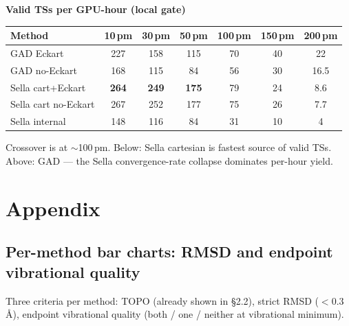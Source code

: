 \documentclass[11pt]{article}
\begin{document}
\begin{center}
\textbf{Valid TSs per GPU-hour (local gate)} \\[0.3em]
\begin{tabular}{l|cccccc}
\toprule
Method & 10\,pm & 30\,pm & 50\,pm & 100\,pm & 150\,pm & 200\,pm \\
\midrule
GAD Eckart                  & 227 & 158 & 115 & 70 & 40 & 22 \\
GAD no-Eckart               & 168 & 115 & 84 & 56 & 30 & 16.5 \\
Sella cart+Eckart           & \textbf{264} & \textbf{249} & \textbf{175} & 79 & 24 & 8.6 \\
Sella cart no-Eckart        & 267 & 252 & 177 & 75 & 26 & 7.7 \\
Sella internal              & 148 & 116 & 84 & 31 & 10 & 4 \\
\bottomrule
\end{tabular}
\end{center}

Crossover is at $\sim$100\,pm. Below: Sella cartesian is fastest source
of valid TSs. Above: GAD --- the Sella convergence-rate collapse
dominates per-hour yield.

\newpage
\section{Appendix}

\clearpage
\subsection{Per-method bar charts: RMSD and endpoint vibrational quality}

Three criteria per method: TOPO (already shown in §2.2), strict RMSD
($<0.3$\,\AA), endpoint vibrational quality (both / one / neither at
vibrational minimum).
\end{document}

